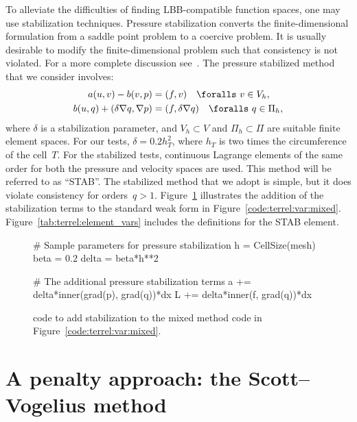 To alleviate the difficulties of finding LBB-compatible function
spaces, one may use stabilization techniques.  Pressure stabilization
converts the finite-dimensional formulation from a saddle point
problem to a coercive problem. It is usually desirable to modify the
finite-dimensional problem such that consistency is not violated. For
a more complete discussion see~\citet{DoneaHuerta2003}.  The pressure
stabilized method that we consider involves:
%
\begin{align}
  a(u, v) - b(v, p)
      &=  (f, v) \quad \foralls \ v \in V_{h},
\\
  b(u, q) +  (\delta\nabla{q},\nabla{p}) &=   (f, \delta \nabla q)
\quad \foralls \ q \in \Pi_{h},
\end{align}
%
where $\delta$ is a stabilization parameter, and $V_{h} \subset V$ and
$\Pi_{h} \subset \Pi$ are suitable finite element spaces. For our tests,
$\delta = 0.2 h_{T}^{2}$, where $h_{T}$ is two times the circumference
of the cell~$T$.  For the stabilized tests, continuous Lagrange
elements of the same order for both the pressure and velocity spaces
are used. This method will be referred to as ``STAB''. The stabilized
method that we adopt is simple, but it does violate consistency
for orders~$q > 1$.  Figure~\ref{code:terrel:var:stab} illustrates
the addition of the stabilization terms to the standard weak form in
Figure~\ref{code:terrel:var:mixed}.  Figure~\ref{tab:terrel:element_vars}
includes the definitions for the STAB element.

\begin{figure}
\begin{python}
# Sample parameters for pressure stabilization
h = CellSize(mesh)
beta = 0.2
delta = beta*h**2

# The additional pressure stabilization terms
a += delta*inner(grad(p), grad(q))*dx
L += delta*inner(f, grad(q))*dx
\end{python}
\caption{\ufl{} code to add stabilization to the mixed method
code in Figure~\ref{code:terrel:var:mixed}.}
\label{code:terrel:var:stab}
\end{figure}
\section{A penalty approach: the Scott--Vogelius method}

